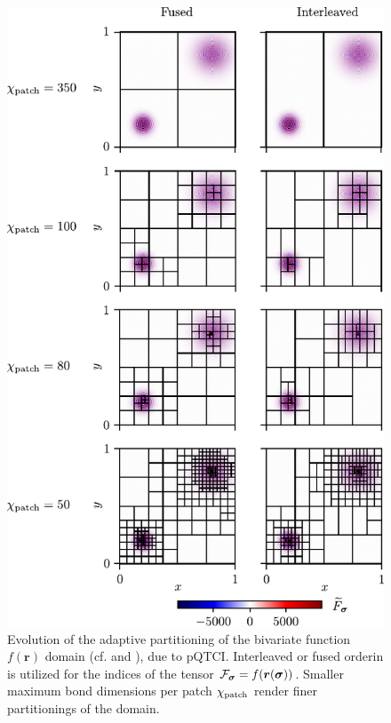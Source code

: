 \begin{figure}[htbp]
	\includegraphics{figures/PatchEvolutionwithChi.pdf}
	\caption{Evolution of the adaptive partitioning of the bivariate function $f(\boldsymbol{r})$ domain (cf.  and ), due to pQTCI. Interleaved or fused orderin is utilized for the indices of the tensor $\mathcal{F}_{\boldsymbol{\sigma}} = f(\boldsymbol{r}(\boldsymbol{\sigma}))$. Smaller maximum bond dimensions per patch $\chi_{\text{patch}}$ render finer partitionings of the domain.}
	\label{fig:patchEvolution}
\end{figure}



